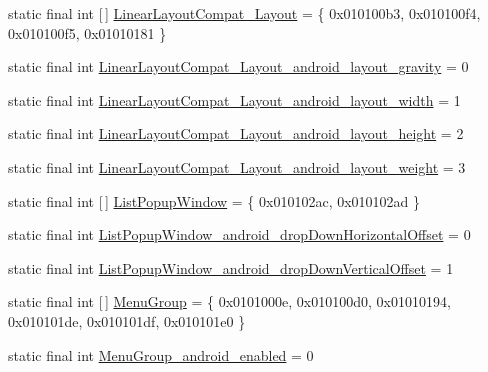 \begin{DoxyCompactItemize}
\item 
static final int \mbox{[}$\,$\mbox{]} \mbox{\hyperlink{classandroid_1_1support_1_1v7_1_1appcompat_1_1R_1_1styleable_abdf078c09964c82c7af689bed5e6f564}{Linear\+Layout\+Compat\+\_\+\+Layout}} = \{ 0x010100b3, 0x010100f4, 0x010100f5, 0x01010181 \}
\item 
static final int \mbox{\hyperlink{classandroid_1_1support_1_1v7_1_1appcompat_1_1R_1_1styleable_a41408b82afaf90814a6a867440e582f4}{Linear\+Layout\+Compat\+\_\+\+Layout\+\_\+android\+\_\+layout\+\_\+gravity}} = 0
\item 
static final int \mbox{\hyperlink{classandroid_1_1support_1_1v7_1_1appcompat_1_1R_1_1styleable_ae18e73da094affbe6cd30ba3ee016462}{Linear\+Layout\+Compat\+\_\+\+Layout\+\_\+android\+\_\+layout\+\_\+width}} = 1
\item 
static final int \mbox{\hyperlink{classandroid_1_1support_1_1v7_1_1appcompat_1_1R_1_1styleable_acdd283d6d9bf29093b48617cafb4fdbd}{Linear\+Layout\+Compat\+\_\+\+Layout\+\_\+android\+\_\+layout\+\_\+height}} = 2
\item 
static final int \mbox{\hyperlink{classandroid_1_1support_1_1v7_1_1appcompat_1_1R_1_1styleable_a4c9a442a48c1fc614818cd237de9a9a9}{Linear\+Layout\+Compat\+\_\+\+Layout\+\_\+android\+\_\+layout\+\_\+weight}} = 3
\item 
static final int \mbox{[}$\,$\mbox{]} \mbox{\hyperlink{classandroid_1_1support_1_1v7_1_1appcompat_1_1R_1_1styleable_a87f1d1e417d9894ead464548553aff2c}{List\+Popup\+Window}} = \{ 0x010102ac, 0x010102ad \}
\item 
static final int \mbox{\hyperlink{classandroid_1_1support_1_1v7_1_1appcompat_1_1R_1_1styleable_a4cd684e1cf8f45b42ae26334bcc094f8}{List\+Popup\+Window\+\_\+android\+\_\+drop\+Down\+Horizontal\+Offset}} = 0
\item 
static final int \mbox{\hyperlink{classandroid_1_1support_1_1v7_1_1appcompat_1_1R_1_1styleable_a8c66ee61979b855940af2e36f6a6a6a0}{List\+Popup\+Window\+\_\+android\+\_\+drop\+Down\+Vertical\+Offset}} = 1
\item 
static final int \mbox{[}$\,$\mbox{]} \mbox{\hyperlink{classandroid_1_1support_1_1v7_1_1appcompat_1_1R_1_1styleable_aef793c0a19e198b57791fed45ec2804e}{Menu\+Group}} = \{ 0x0101000e, 0x010100d0, 0x01010194, 0x010101de, 0x010101df, 0x010101e0 \}
\item 
static final int \mbox{\hyperlink{classandroid_1_1support_1_1v7_1_1appcompat_1_1R_1_1styleable_a01f2ab8d4d7690f5655245195aa803ce}{Menu\+Group\+\_\+android\+\_\+enabled}} = 0
\item 

\end{DoxyCompactItemize}
